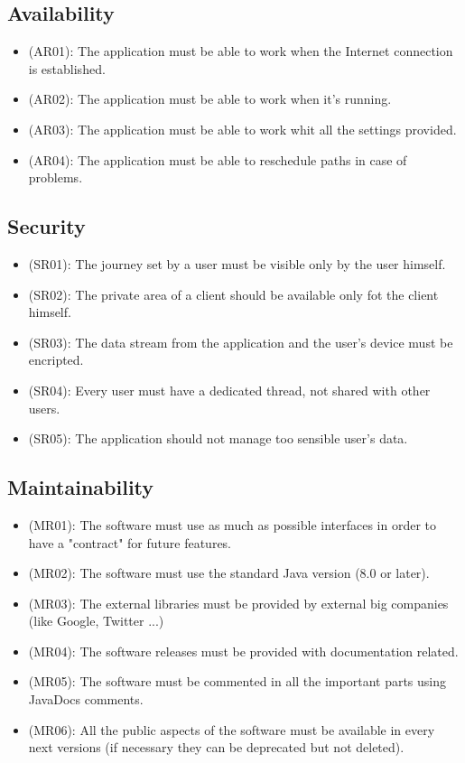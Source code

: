 \documentclass[a4paper,leqno]{book}
\begin{document}
\subsection{Availability}
\begin{itemize}
\item (AR01): The application must be able to work when the Internet connection is established.
\item (AR02): The application must be able to work when it's running.
\item (AR03): The application must be able to work whit all the settings provided.
\item (AR04): The application must be able to reschedule paths in case of problems.
\end{itemize}

\subsection{Security}
\begin{itemize}
\item (SR01): The journey set by a user must be visible only by the user himself.
\item (SR02): The private area of a client should be available only fot the client himself.
\item (SR03): The data stream from the application and the user's device must be encripted.
\item (SR04): Every user must have a dedicated thread, not shared with other users.
\item (SR05): The application should not manage too sensible user's data.
\end{itemize}

\subsection{Maintainability}
\begin{itemize}
\item (MR01): The software must use as much as possible interfaces in order to have a "contract" for future features.
\item (MR02): The software must use the standard Java version (8.0 or later).
\item (MR03): The external libraries must be provided by external big companies (like Google, Twitter ...)
\item (MR04): The software releases must be provided with documentation related.
\item (MR05): The software must be commented in all the important parts using JavaDocs comments.
\item (MR06): All the public aspects of the software must be available in every next versions (if necessary they can be deprecated but not deleted).
\end{itemize}
\end{document}
